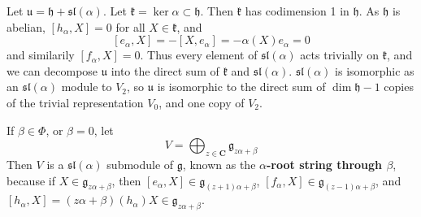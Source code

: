 \begin{example}
    Let $\mathfrak{u} = \mathfrak{h} + \mathfrak{sl}(\alpha)$. Let $\mathfrak{k} = \ker \alpha \subset \mathfrak{h}$. Then $\mathfrak{k}$ has codimension 1 in $\mathfrak{h}$. As $\mathfrak{h}$ is abelian, $[h_\alpha,X] = 0$ for all $X \in \mathfrak{k}$, and
    \[ [e_\alpha, X] = - [X, e_\alpha] = -\alpha(X) e_\alpha = 0 \]
    and similarily $[f_\alpha, X] = 0$. Thus every element of $\mathfrak{sl}(\alpha)$ acts trivially on $\mathfrak{k}$, and we can decompose $\mathfrak{u}$ into the direct sum of $\mathfrak{k}$ and $\mathfrak{sl}(\alpha)$. $\mathfrak{sl}(\alpha)$ is isomorphic as an $\mathfrak{sl}(\alpha)$ module to $V_2$, so $\mathfrak{u}$ is isomorphic to the direct sum of $\dim \mathfrak{h} - 1$ copies of the trivial representation $V_0$, and one copy of $V_2$.
\end{example}

\begin{example}
    If $\beta \in \Phi$, or $\beta = 0$, let
    \[ V = \bigoplus_{z \in \mathbf{C}} \mathfrak{g}_{z\alpha + \beta} \]
    Then $V$ is a $\mathfrak{sl}(\alpha)$ submodule of $\mathfrak{g}$, known as the {\bf $\alpha$-root string through $\beta$}, because if $X \in \mathfrak{g}_{z\alpha + \beta}$, then $[e_\alpha, X] \in \mathfrak{g}_{(z + 1)\alpha + \beta}$, $[f_\alpha, X] \in \mathfrak{g}_{(z-1)\alpha + \beta}$, and $[h_\alpha,X] = (z\alpha + \beta)(h_\alpha) X \in \mathfrak{g}_{z\alpha + \beta}$.
\end{example}

